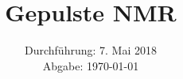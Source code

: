 

\subject{V49}
\title{Gepulste NMR}
\date{%
  Durchführung: 7. Mai 2018
  \\
  Abgabe: \today
}



\maketitle
\thispagestyle{empty}
\tableofcontents
\newpage






% 

\printbibliography{}


